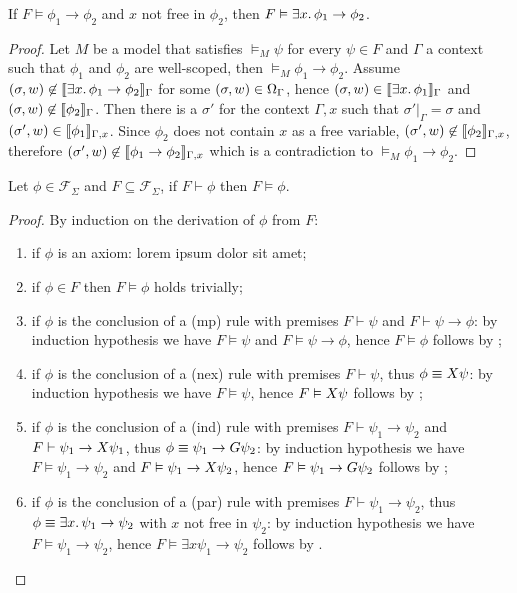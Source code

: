 \begin{lemma}\label{lem:par}
  If $F \vDash \phi_1 \to \phi_2$ and $x$ not free in $\phi_2$, then $F \vDash \exists {x} \ldotp {\phi_1} \to \phi_2$.
\end{lemma}
\begin{proof}
  Let $M$ be a model that satisfies $\vDash_M \psi$ for every $\psi \in F$ and $\Gamma$ a context such that $\phi_1$ and
  $\phi_2$ are well-scoped, then $\vDash_M \phi_1 \to \phi_2$.
  Assume $(\sigma, w) \not\in \llbracket \exists {x} \ldotp {\phi_1} \to \phi_2 \rrbracket_{\Gamma}$ for some $(\sigma, w) \in
  \Omega_{\Gamma}$, hence $(\sigma, w) \in \llbracket \exists {x} \ldotp {\phi_1} \rrbracket_{\Gamma}$ and $(\sigma, w) \not\in
  \llbracket \phi_2 \rrbracket_{\Gamma}$. Then there is a $\sigma'$ for the context $\Gamma, x$ such that $\sigma'|_\Gamma = \sigma$ and
  $(\sigma', w) \in \llbracket \phi_1 \rrbracket_{\Gamma, x}$. Since $\phi_2$ does not contain $x$ as a free variable, $(\sigma', w)
  \not\in \llbracket \phi_2 \rrbracket_{\Gamma, x}$, therefore $(\sigma', w) \not\in \llbracket \phi_1 \to \phi_2 \rrbracket_{\Gamma, x}$ which is a
  contradiction to $\vDash_M \phi_1 \to \phi_2$.
\end{proof}

\begin{theorem}[Soundness]
  Let $\phi \in \mathcal{F}_\Sigma$ and $F \subseteq \mathcal{F}_\Sigma$, if $F \vdash \phi$ then $F \vDash \phi$.
\end{theorem}
\begin{proof}
  By induction on the derivation of $\phi$ from $F$:
  \begin{enumerate}
    \item if $\phi$ is an axiom: lorem ipsum dolor sit amet;
    \item if $\phi \in F$ then $F \vDash \phi$ holds trivially;
    \item if $\phi$ is the conclusion of a (mp) rule with premises $F \vdash \psi$ and $F \vdash \psi \to \phi$: by
      induction hypothesis we have $F \vDash \psi$ and $F \vDash \psi \to \phi$, hence $F \vDash \phi$ follows by
      ;
    \item if $\phi$ is the conclusion of a (nex) rule with premises $F \vdash \psi$, thus $\phi \equiv X{\psi}$: by
      induction hypothesis we have $F \vDash \psi$, hence $F \vDash X{\psi}$ follows by ;
    \item if $\phi$ is the conclusion of a (ind) rule with premises $F \vdash \psi_1 \to \psi_2$ and $F \vdash \psi_1
      \to X{\psi_1}$, thus $\phi \equiv \psi_1 \to G{\psi_2}$: by induction hypothesis we have $F \vDash
      \psi_1 \to \psi_2$ and $F \vDash \psi_1 \to X{\psi_2}$, hence $F \vDash \psi_1 \to G{\psi_2}$ follows
      by ;
    \item if $\phi$ is the conclusion of a (par) rule with premises $F \vdash \psi_1 \to \psi_2$, thus $\phi \equiv
      \exists {x} \ldotp {\psi_1} \to \psi_2$ with $x$ not free in $\psi_2$: by induction hypothesis we have $F \vDash \psi_1
      \to \psi_2$, hence $F \vDash \exists{x}{\psi_1} \to \psi_2$ follows by .
  \end{enumerate}
\end{proof}

